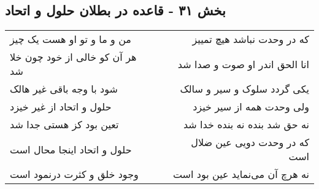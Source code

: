 \begin{center}
\section*{بخش ۳۱ - قاعده در بطلان حلول و اتحاد}
\label{sec:sh031}
\begin{longtable}{l p{0.5cm} r}
من و ما و تو او هست یک چیز
&&
که در وحدت نباشد هیچ تمییز
\\
هر آن کو خالی از خود چون خلا شد
&&
انا الحق اندر او صوت و صدا شد
\\
شود با وجه باقی غیر هالک
&&
یکی گردد سلوک و سیر و سالک
\\
حلول و اتحاد از غیر خیزد
&&
ولی وحدت همه از سیر خیزد
\\
تعین بود کز هستی جدا شد
&&
نه حق شد بنده نه بنده خدا شد
\\
حلول و اتحاد اینجا محال است
&&
که در وحدت دویی عین ضلال است
\\
وجود خلق و کثرت درنمود است
&&
نه هرچ آن می‌نماید عین بود است
\\
\end{longtable}
\end{center}
